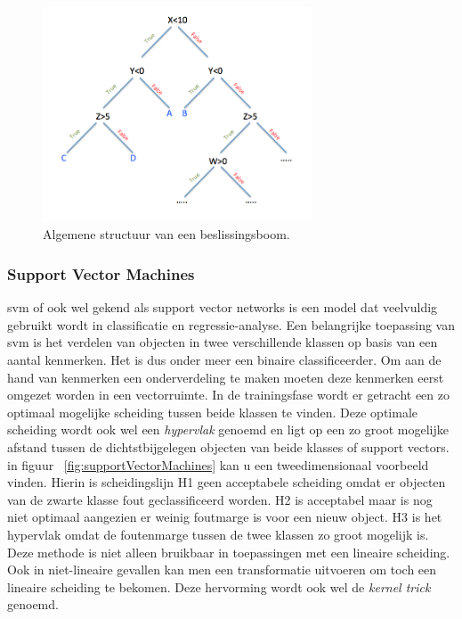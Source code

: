 		\begin{figure}
			\centering
			\includegraphics[width=80mm]{afbeeldingen/beslissingsBoom.PNG}
			\caption[Algemene structuur van een beslissingsboom.]{Algemene structuur van een beslissingsboom\cite{bron:beslissingsboom}.}
			\label{fig:beslissingsBoom}
		\end{figure}
		
		
	
	
	\subsubsection{Support Vector Machines}
	\gls{svm} of ook wel gekend als support vector networks is een model dat veelvuldig gebruikt wordt in classificatie en regressie-analyse. Een belangrijke toepassing van \gls{svm} is het verdelen van objecten in twee verschillende klassen op basis van een aantal kenmerken. Het is dus onder meer een binaire classificeerder. Om aan de hand van kenmerken een onderverdeling te maken moeten deze kenmerken eerst omgezet worden in een vectorruimte. In de trainingsfase wordt er getracht een zo optimaal mogelijke scheiding tussen beide klassen te vinden. Deze optimale scheiding wordt ook wel een \textit{hypervlak} genoemd en ligt op een zo groot mogelijke afstand tussen de dichtstbijgelegen objecten van beide klasses of support vectors. in figuur ~\ref{fig:supportVectorMachines} kan u een tweedimensionaal voorbeeld vinden. Hierin is scheidingslijn H1 geen acceptabele scheiding omdat er objecten van de zwarte klasse fout geclassificeerd worden. H2 is acceptabel maar is nog niet optimaal aangezien er weinig foutmarge is voor een nieuw object. H3 is het hypervlak omdat de foutenmarge tussen de twee klassen zo groot mogelijk is. Deze methode is niet alleen bruikbaar in toepassingen met een lineaire scheiding. Ook in niet-lineaire gevallen kan men een transformatie uitvoeren om toch een lineaire scheiding te bekomen. Deze hervorming wordt ook wel de \textit{kernel trick}\cite{sun2018kernel} genoemd. 
	
